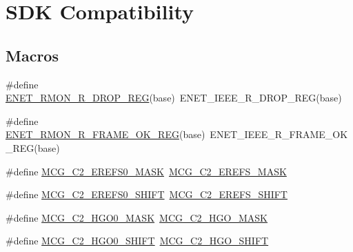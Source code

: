 \hypertarget{group___s_d_k___compatibility___symbols}{}\section{S\+DK Compatibility}
\label{group___s_d_k___compatibility___symbols}
\subsection*{Macros}
\begin{DoxyCompactItemize}
\item 
\#define \mbox{\hyperlink{group___s_d_k___compatibility___symbols_gaa42b3294937bb78ddcb71cbc54151c85}{E\+N\+E\+T\+\_\+\+R\+M\+O\+N\+\_\+\+R\+\_\+\+D\+R\+O\+P\+\_\+\+R\+EG}}(base)~E\+N\+E\+T\+\_\+\+I\+E\+E\+E\+\_\+\+R\+\_\+\+D\+R\+O\+P\+\_\+\+R\+EG(base)
\item 
\#define \mbox{\hyperlink{group___s_d_k___compatibility___symbols_gaa157073b7098ee58966120129393c9ec}{E\+N\+E\+T\+\_\+\+R\+M\+O\+N\+\_\+\+R\+\_\+\+F\+R\+A\+M\+E\+\_\+\+O\+K\+\_\+\+R\+EG}}(base)~E\+N\+E\+T\+\_\+\+I\+E\+E\+E\+\_\+\+R\+\_\+\+F\+R\+A\+M\+E\+\_\+\+O\+K\+\_\+\+R\+EG(base)
\item 
\#define \mbox{\hyperlink{group___s_d_k___compatibility___symbols_gae9a32b79976c185a9b6567cc74b2d5af}{M\+C\+G\+\_\+\+C2\+\_\+\+E\+R\+E\+F\+S0\+\_\+\+M\+A\+SK}}~\mbox{\hyperlink{group___m_c_g___register___masks_ga2c7a64bac24e9840a1b38fd20f45ee32}{M\+C\+G\+\_\+\+C2\+\_\+\+E\+R\+E\+F\+S\+\_\+\+M\+A\+SK}}
\item 
\#define \mbox{\hyperlink{group___s_d_k___compatibility___symbols_ga1cea960436deb685a7f131203e4898b5}{M\+C\+G\+\_\+\+C2\+\_\+\+E\+R\+E\+F\+S0\+\_\+\+S\+H\+I\+FT}}~\mbox{\hyperlink{group___m_c_g___register___masks_gaf8a3c1b95c6c95b6b86dd47ee3e8df8d}{M\+C\+G\+\_\+\+C2\+\_\+\+E\+R\+E\+F\+S\+\_\+\+S\+H\+I\+FT}}
\item 
\#define \mbox{\hyperlink{group___s_d_k___compatibility___symbols_ga58de06b4d4514888ca2e7cbc68e50ccc}{M\+C\+G\+\_\+\+C2\+\_\+\+H\+G\+O0\+\_\+\+M\+A\+SK}}~\mbox{\hyperlink{group___m_c_g___register___masks_gaebd354dd4b68914ead6f2604e4aaf6f0}{M\+C\+G\+\_\+\+C2\+\_\+\+H\+G\+O\+\_\+\+M\+A\+SK}}
\item 
\#define \mbox{\hyperlink{group___s_d_k___compatibility___symbols_ga881979b382aef0029c4e4990e365d8f5}{M\+C\+G\+\_\+\+C2\+\_\+\+H\+G\+O0\+\_\+\+S\+H\+I\+FT}}~\mbox{\hyperlink{group___m_c_g___register___masks_ga803a8ad30224642fcf09f8d738a21e52}{M\+C\+G\+\_\+\+C2\+\_\+\+H\+G\+O\+\_\+\+S\+H\+I\+FT}}

\end{DoxyCompactItemize}
